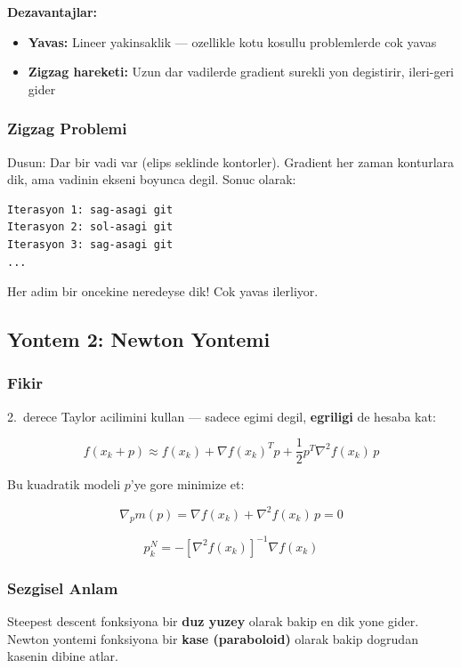 \documentclass[12pt,a4paper]{article}
\theoremstyle{definition}
\theoremstyle{remark}
\begin{document}
\textbf{Dezavantajlar:}
\begin{itemize}[leftmargin=*, itemsep=0.2em]
\item \textbf{Yavas:} Lineer yakinsaklik --- ozellikle kotu kosullu problemlerde cok yavas
\item \textbf{Zigzag hareketi:} Uzun dar vadilerde gradient surekli yon degistirir, ileri-geri gider
\end{itemize}

\subsubsection{Zigzag Problemi}

Dusun: Dar bir vadi var (elips seklinde kontorler). Gradient her zaman konturlara dik, ama vadinin ekseni boyunca degil. Sonuc olarak:

\begin{Verbatim}[frame=single, fontsize=\small]
Iterasyon 1: sag-asagi git
Iterasyon 2: sol-asagi git
Iterasyon 3: sag-asagi git
...
\end{Verbatim}

Her adim bir oncekine neredeyse dik! Cok yavas ilerliyor.

\subsection{Yontem 2: Newton Yontemi}

\subsubsection{Fikir}

2.\ derece Taylor acilimini kullan --- sadece egimi degil, \textbf{egriligi} de hesaba kat:

\[
f(x_k + p) \approx f(x_k) + \nabla f(x_k)^T p + \frac{1}{2} p^T \nabla^2 f(x_k) \, p
\]

Bu kuadratik modeli $p$'ye gore minimize et:

\[
\nabla_p m(p) = \nabla f(x_k) + \nabla^2 f(x_k) \, p = 0
\]

\[
\boxed{p_k^N = -[\nabla^2 f(x_k)]^{-1} \nabla f(x_k)}
\]

\subsubsection{Sezgisel Anlam}

Steepest descent fonksiyona bir \textbf{duz yuzey} olarak bakip en dik yone gider. Newton yontemi fonksiyona bir \textbf{kase (paraboloid)} olarak bakip dogrudan kasenin dibine atlar.
\end{document}
